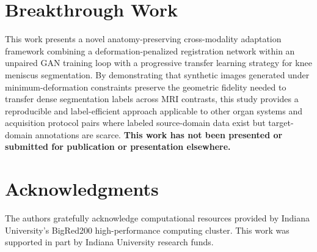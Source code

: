 \documentclass[12pt, a4paper]{article}
\begin{document}
\section{Breakthrough Work}

This work presents a novel anatomy-preserving cross-modality adaptation framework combining a deformation-penalized registration network within an unpaired GAN training loop with a progressive transfer learning strategy for knee meniscus segmentation. By demonstrating that synthetic images generated under minimum-deformation constraints preserve the geometric fidelity needed to transfer dense segmentation labels across MRI contrasts, this study provides a reproducible and label-efficient approach applicable to other organ systems and acquisition protocol pairs where labeled source-domain data exist but target-domain annotations are scarce. \textbf{This work has not been presented or submitted for publication or presentation elsewhere.}

\section*{Acknowledgments}

The authors gratefully acknowledge computational resources provided by Indiana University's BigRed200 high-performance computing cluster. This work was supported in part by Indiana University research funds.
\end{document}
